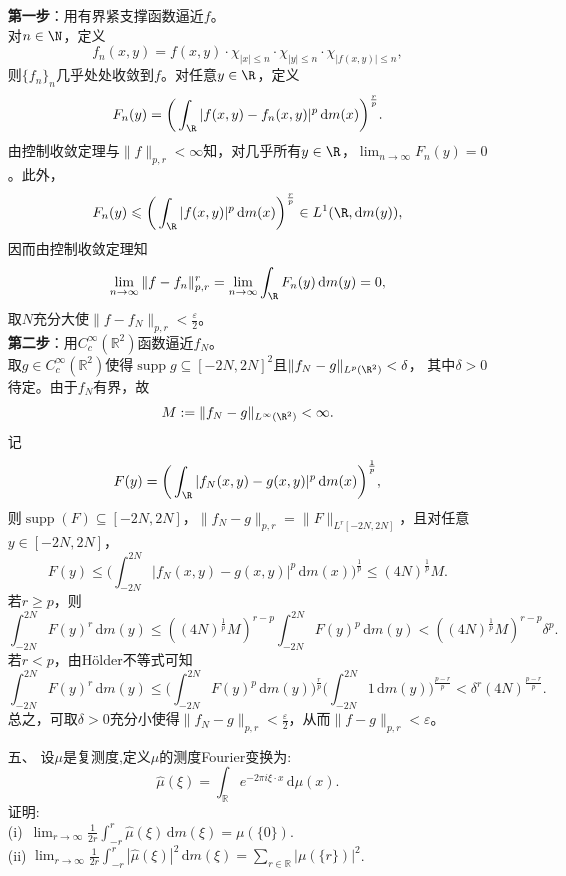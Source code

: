 \begin{itemize}
    \begin{proofc}[解答]
        \textbf{第一步}：用有界紧支撑函数逼近$f$。\\
        对$n\in\N$，定义
        \[f_n(x,y)=f(x,y)\cdot\chi_{|x|\leqslant n}\cdot\chi_{|y|\leqslant n}\cdot\chi_{|f(x,y)|\leqslant n},\]
        则$\{f_n\}_n$几乎处处收敛到$f$。对任意$y\in\R$，定义
        \[F_n(y)=\bigg( \int_{\R}|f(x,y)-f_n(x,y)|^p\,\mathrm{d}m(x) \bigg)^{\frac{r}{p}}.\]
        由控制收敛定理与$\| f\|_{p,r} < \infty$知，对几乎所有$y\in\R$，$\lim_{n\to\infty}F_n(y)=0$。此外，
        \[F_n(y)\leqslant\bigg( \int_{\R}|f(x,y)|^p\,\mathrm{d}m(x) \bigg)^{\frac{r}{p}}\in L^1(\R,\mathrm{d}m(y)),\]
        因而由控制收敛定理知
        \[\lim_{n\to\infty}\|f-f_n\|_{p,r}^r=\lim_{n\to\infty}\int_{\R}F_n(y)\,\mathrm{d}m(y)=0,\]
        取$N$充分大使$\|f-f_N\|_{p,r}<\frac{\varepsilon}{2}$。\\
        \textbf{第二步}：用$C_c^{\infty}(\mathbb{R}^2)$函数逼近$f_N$。\\
        取$g\in C_c^{\infty}(\mathbb{R}^2)$使得$\operatorname{supp}g\subseteq[-2N,2N]^2$且$\|f_N-g\|_{L^p(\R^2)}<\delta$，
        其中$\delta>0$待定。由于$f_N$有界，故
        \[M:=\|f_N-g\|_{L^{\infty}(\R^2)}<\infty.\]
        记
        \[F(y)=\bigg(\int_{\R}|f_N(x,y)-g(x,y)|^p\,\mathrm{d}m(x)\bigg)^{\frac{1}{p}},\]
        则$\operatorname{supp}(F)\subseteq[-2N,2N]$，$\|f_N-g\|_{p,r}=\|F\|_{L^r[-2N,2N]}$，且对任意$y\in[-2N,2N]$，
        \[F(y)\leqslant\bigg(\int_{-2N}^{2N}|f_N(x,y)-g(x,y)|^p\,\mathrm{d}m(x)\bigg)^{\frac{1}{p}}\leqslant(4N)^{\frac{1}{p}}M.\]
        若$r\geqslant p$，则
        \[\int_{-2N}^{2N}F(y)^r\,\mathrm{d}m(y)\leqslant((4N)^{\frac{1}{p}}M)^{r-p}\int_{-2N}^{2N}F(y)^p\,\mathrm{d}m(y)<((4N)^{\frac{1}{p}}M)^{r-p}\delta^p.\]
        若$r<p$，由H\"older不等式可知
        \[\int_{-2N}^{2N}F(y)^r\,\mathrm{d}m(y)\leqslant\bigg(\int_{-2N}^{2N}F(y)^p\,\mathrm{d}m(y)\bigg)^{\frac{r}{p}}\bigg(\int_{-2N}^{2N}1\,\mathrm{d}m(y)\bigg)^{\frac{p-r}{p}}<\delta^r(4N)^{\frac{p-r}{p}}.\]
        总之，可取$\delta>0$充分小使得$\|f_N-g\|_{p,r}<\frac{\varepsilon}{2}$，从而$\|f-g\|_{p,r}<\varepsilon$。
    \end{proofc}
    
    \item[五、]
    设$\mu$是复测度,定义$\mu$的测度Fourier变换为:
    \[\hat{\mu}(\xi) = \int_\mathbb{R} e^{-2\pi i \xi \cdot x} \,\mathrm{d} \mu(x).\]
    证明:\\
    (i)\ $\displaystyle \lim_{r \to \infty} \frac{1}{2r} \int_{-r}^{r} \hat{\mu} (\xi) \,\mathrm{d} m(\xi) = \mu (\{0\})$.\\
    (ii) $\displaystyle \lim_{r \to \infty} \frac{1}{2r} \int_{-r}^{r} |\hat{\mu} (\xi)|^2 \,\mathrm{d} m(\xi) = \sum_{r\in \mathbb{R}}|\mu (\{r\})|^2$.


\end{itemize}
